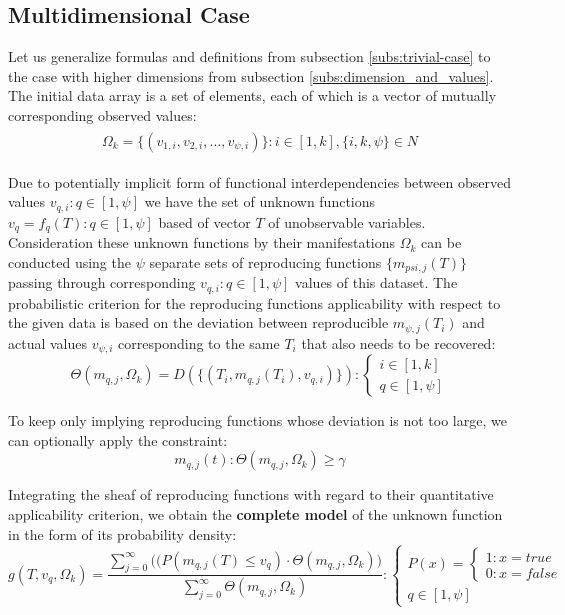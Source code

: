 \documentclass[a4paper, 11pt, oneside]{book}
\begin{document}
\subsection{Multidimensional Case}
Let us generalize formulas and definitions from subsection \ref{subs:trivial-case} to the case with higher dimensions from subsection \ref{subs:dimension_and_values}. The initial data array is a set of elements, each of which is a vector of mutually corresponding observed values:
\begin{align}\label{eq:nd-dataset}
  \begin{split}
    \Omega_k = \{(v_{1, i}, v_{2, i}, \ldots, v_{\psi, i})\}: i \in [1, k], \{i, k, \psi\} \in N
  \end{split}
\end{align}

Due to potentially implicit form of functional interdependencies between observed values $v_{q, i}: q \in [1, \psi]$ we have the set of unknown functions $v_q = f_q(T): q \in [1, \psi]$ based of vector $T$ of unobservable variables. Consideration these unknown functions by their manifestations $\Omega_k$ can be conducted using the $\psi$ separate sets of reproducing functions $\{m_{psi, j}(T)\}$ passing through corresponding $v_{q, i}: q \in [1, \psi]$ values of this dataset. The probabilistic criterion for the reproducing functions applicability with respect to the given data is based on the deviation between reproducible $m_{\psi, j}(T_i)$ and actual values $v_{\psi, i}$ corresponding to the same $T_i$ that also needs to be recovered:
\begin{equation}\label{eq:deviation-of-nd-dataset}
  \Theta(m_{q, j}, \Omega_k) = D(\{(T_i, m_{q, j}(T_i), v_{q, i})\}):
  \begin{cases}
    i \in [1, k] \\
    q \in [1, \psi]
  \end{cases}
\end{equation}

To keep only implying reproducing functions whose deviation is not too large, we can optionally apply the constraint:
\begin{equation}\label{eq:acceptable-deviation-of-nd-dataset}
  {m_{q, j}(t)}: \Theta(m_{q, j}, \Omega_k) \geq \gamma
\end{equation}

Integrating the sheaf of reproducing functions with regard to their quantitative applicability criterion, we obtain the \textbf{complete model} of the unknown function in the form of its probability density:
\begin{equation}\label{eq:full_model-for-nd-dataset}
  g(T, v_q, \Omega_k) = \frac{\displaystyle \sum_{j = 0}^{\infty} \Big((P(m_{q, j}(T) \leq v_q) \cdot \Theta(m_{q, j}, \Omega_k) \Big)}{\displaystyle \sum_{j = 0}^{\infty}\Theta(m_{q, j}, \Omega_k)}:
  \begin{cases}
    P(x) = \begin{cases}1: x = true\\0: x = false \end{cases} \\
    q \in [1, \psi]
  \end{cases}    
\end{equation}
\end{document}
